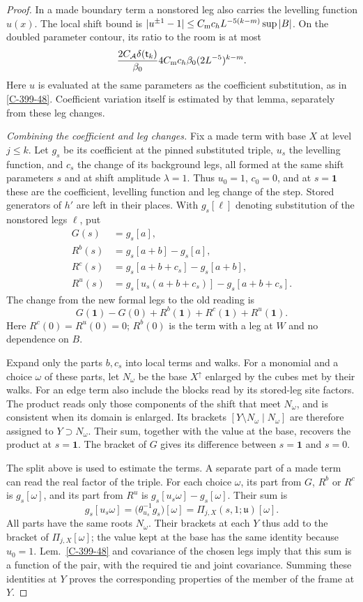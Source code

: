 \documentclass[11pt,letterpaper,reqno]{amsart}
\theoremstyle{definition}
\theoremstyle{remark}
\begin{document}
\begin{proof}
In a made boundary term a nonstored leg also carries
the levelling function $u(x)$. The local shift bound is
$|u^{\pm1}-1|\le C_{\rm m}c_h
L^{-5(k-m)}\sup|B|$. On the doubled parameter contour,
its ratio to the room is at most
\[
 \frac{2C_{\mathcal A}\delta(\mathsf t_k)}{\beta_0}
 4C_{\rm m}c_h\beta_0(2L^{-5})^{k-m}.
\]
Here $u$ is evaluated at the same parameters as the
coefficient substitution, as in \cref{C-399-48}.
Coefficient variation itself is estimated by that
lemma, separately from these leg changes.

\emph{Combining the coefficient and leg changes.}
Fix a made term with base $X$ at level $j\le k$.
Let $g_s$ be its coefficient at the pinned substituted
triple, $u_s$ the levelling function, and $c_s$ the change
of its background legs, all formed at the same shift
parameters $s$ and at shift amplitude $\lambda=1$.
Thus $u_0=1$, $c_0=0$, and at $s=\mathbf1$ these are the
coefficient, levelling function and leg change of the step.
Stored generators of $h'$ are left in their places.
With $g_s[\ell]$ denoting substitution of the nonstored
legs $\ell$, put
\[
\begin{split}
 G(s)&=g_s[a],\\
 R^b(s)&=g_s[a+b]-g_s[a],\\
 R^c(s)&=g_s[a+b+c_s]-g_s[a+b],\\
 R^u(s)&=g_s[u_s(a+b+c_s)]-g_s[a+b+c_s].
\end{split}
\]
The change from the new formal legs to the old reading is
\[
 G(\mathbf1)-G(0)+R^b(\mathbf1)
                    +R^c(\mathbf1)+R^u(\mathbf1).
\]
Here $R^c(0)=R^u(0)=0$; $R^b(0)$ is the term with a
leg at $W$ and no dependence on $B$.

Expand only the parts $b,c_s$ into local terms and walks.
For a monomial and a choice $\omega$ of these parts, let
$N_\omega$ be the base $X^\uparrow$ enlarged by the cubes
met by their walks. For an edge term also include the
blocks read by its stored-leg site factors. The product
reads only those components of the shift that meet
$N_\omega$, and is consistent when its domain is enlarged.
Its brackets $[Y\setminus N_\omega\mid N_\omega]$ are
therefore assigned to $Y\supset N_\omega$. Their sum,
together with the value at the base, recovers the product
at $s=\mathbf1$. The bracket of $G$ gives its difference
between $s=\mathbf1$ and $s=0$.

The split above is used to estimate the terms. A separate
part of a made term can read the real factor of the
triple. For each choice $\omega$, its part from $G$, $R^b$
or $R^c$ is $g_s[\omega]$, and its part from $R^u$ is
$g_s[u_s\omega]-g_s[\omega]$. Their sum is
\[
 g_s[u_s\omega]
   =\bigl(\theta_{u_s}^{-1}g_s\bigr)[\omega]
   =\Pi_{j,X}(s,1;\mathfrak u)[\omega].
\]
All parts have the same roots $N_\omega$. Their brackets
at each $Y$ thus add to the bracket of $\Pi_{j,X}[\omega]$;
the value kept at the base has the same identity because
$u_0=1$. Lem.~\ref{C-399-48} and covariance of the chosen
legs imply that this sum is a function of the pair, with
the required tie and joint covariance. Summing these
identities at $Y$ proves the corresponding properties
of the member of the frame at $Y$.


\end{proof}
\end{document}
